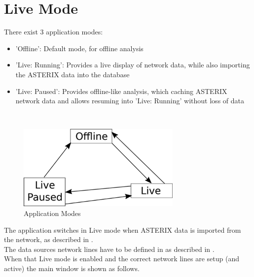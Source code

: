 \chapter{Live Mode}
\label{sec:live_mode}

There exist 3 application modes:
\begin{itemize}
\item 'Offline': Default mode, for offline analysis
\item 'Live: Running': Provides a live display of network data, while also importing the ASTERIX data into the database
\item 'Live: Paused': Provides offline-like analysis, which caching ASTERIX network data and allows resuming into 'Live: Running' without loss of data
\end{itemize}
\ \\

\begin{figure}[H]
 \center
    \includegraphics[width=8cm]{figures/modes.png}
  \caption{Application Modes}
\end{figure}


The application switches in Live mode when ASTERIX data is imported from the network, as described in . \\

The data sources network lines have to be defined in as described in . \\

When that Live mode is enabled and the correct network lines are setup (and active) the main window is shown as follows. 

